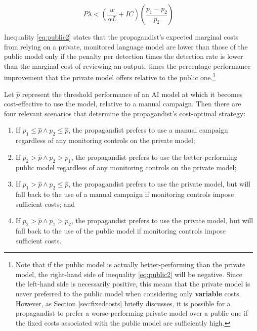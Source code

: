 \documentclass{article}
\begin{document}
\begin{equation}
  \label{eq:public2}
  P\lambda < \left(\frac{w}{\alpha L} + IC\right)\left(\frac{p_1 - p_2}{p_2}\right)
\end{equation}

Inequality \ref{eq:public2} states that the propagandist's expected marginal costs from relying on a private, monitored language model are lower than those of the public model only if the penalty per detection times the detection rate is lower than the marginal cost of reviewing an output, times the percentage performance improvement that the private model offers relative to the public one.\footnote{Note that if the public model is actually better-performing than the private model, the right-hand side of inequality \ref{eq:public2} will be negative. Since the left-hand side is necessarily positive, this means that the private model is never preferred to the public model when considering only \textbf{variable} costs. However, as Section \ref{sec:fixedcosts} briefly discusses, it is possible for a propagandist to prefer a worse-performing private model over a public one if the fixed costs associated with the public model are sufficiently high.} 

Let $\hat{p}$ represent the threshold performance of an AI model at which it becomes cost-effective to use the model, relative to a manual campaign. Then there are four relevant scenarios that determine the propagandist's cost-optimal strategy: 

\begin{enumerate}
  \item If $p_1 \leq \hat{p} \land p_2 \leq \hat{p}$, the propagandist prefers to use a manual campaign regardless of any monitoring controls on the private model;
  \item If $p_2 > \hat{p} \land p_2 > p_1$, the propagandist prefers to use the better-performing public model regardless of any monitoring controls on the private model; 
  \item If $p_1 > \hat{p} \land p_2 \leq \hat{p}$, the propagandist prefers to use the private model, but will fall back to the use of a manual campaign if monitoring controls impose sufficient costs; and
  \item If $p_2 > \hat{p} \land p_1 > p_2$, the propagandist prefers to use the private model, but will fall back to the use of the public model if monitoring controls impose sufficient costs.
\end{enumerate}
\end{document}
